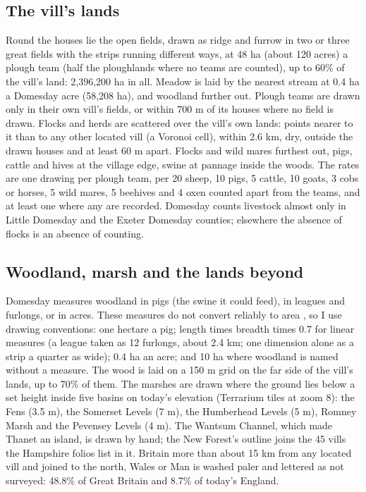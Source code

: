\documentclass[11pt,a4paper]{article}
\begin{document}
\subsection{The vill's lands}
Round the houses lie the open fields, drawn as ridge and furrow in two or three great fields with the strips running different ways, at 48 ha (about 120 acres) a plough team (half the ploughlands where no teams are counted), up to 60\% of the vill's land: 2,396,200 ha in all. Meadow is laid by the nearest stream at 0.4 ha a Domesday acre (58,208 ha), and woodland further out. Plough teams are drawn only in their own vill's fields, or within 700 m of its houses where no field is drawn. Flocks and herds are scattered over the vill's own lands: points nearer to it than to any other located vill (a Voronoi cell), within 2.6 km, dry, outside the drawn houses and at least 60 m apart. Flocks and wild mares furthest out, pigs, cattle and hives at the village edge, swine at pannage inside the woods. The rates are one drawing per plough team, per 20 sheep, 10 pigs, 5 cattle, 10 goats, 3 cobs or horses, 5 wild mares, 5 beehives and 4 oxen counted apart from the teams, and at least one where any are recorded. Domesday counts livestock almost only in Little Domesday and the Exeter Domesday counties; elsewhere the absence of flocks is an absence of counting.

\subsection{Woodland, marsh and the lands beyond}
Domesday measures woodland in pigs (the swine it could feed), in leagues and furlongs, or in acres. These measures do not convert reliably to area \cite{darby}, so I use drawing conventions: one hectare a pig; length times breadth times 0.7 for linear measures (a league taken as 12 furlongs, about 2.4 km; one dimension alone as a strip a quarter as wide); 0.4 ha an acre; and 10 ha where woodland is named without a measure. The wood is laid on a 150 m grid on the far side of the vill's lands, up to 70\% of them. The marshes are drawn where the ground lies below a set height inside five basins on today's elevation (Terrarium tiles at zoom 8): the Fens (3.5 m), the Somerset Levels (7 m), the Humberhead Levels (5 m), Romney Marsh and the Pevensey Levels (4 m). The Wantsum Channel, which made Thanet an island, is drawn by hand; the New Forest's outline joins the 45 vills the Hampshire folios list in it. Britain more than about 15 km from any located vill and joined to the north, Wales or Man is washed paler and lettered as not surveyed: 48.8\% of Great Britain and 8.7\% of today's England.
\end{document}
